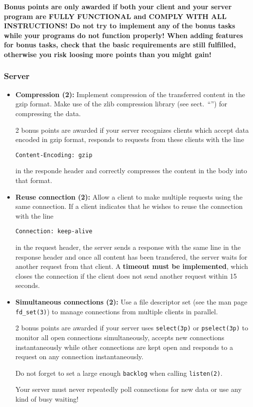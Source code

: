 \textbf{Bonus points are only awarded
if both your client and your server program are FULLY FUNCTIONAL
and COMPLY WITH ALL INSTRUCTIONS!
Do not try to implement any of the bonus tasks
while your programs do not function properly!
When adding features for bonus tasks,
check that the basic requirements are still fulfilled,
otherwise you risk loosing more points than you might gain!}

\subsubsection*{Server}

\begin{itemize}

\item \textbf{Compression (2):}
Implement compression of the transferred content in the gzip format.
Make use of the zlib compression library (see sect.~``'')
for compressing the data.

2 bonus points are awarded if your server recognizes clients
which accept data encoded in gzip format,
responds to requests from these clients with the line
\begin{verbatim}
Content-Encoding: gzip
\end{verbatim}
in the responde header
and correctly compresses the content in the body into that format.

\item \textbf{Reuse connection (2):}
Allow a client to make multiple requests using the same connection.
If a client indicates that he wishes to reuse the connection with the line
\begin{verbatim}
Connection: keep-alive
\end{verbatim}
in the request header,
the server sends a response with the same line in the response header
and once all content has been transfered,
the server waits for another request from that client.
A \textbf{timeout must be implemented},
which closes the connection
if the client does not send another request within 15 seconds.

\item \textbf{Simultaneous connections (2):}
Use a file descriptor set (see the man page \texttt{fd\_set(3)})
to manage connections from multiple clients in parallel.

2 bonus points are awarded if your server uses \texttt{select(3p)} or \texttt{pselect(3p)}
to monitor all open connections simultaneously,
accepts new connections instantaneously while other connections are kept open
and responds to a request on any connection instantaneously.

Do not forget to set a large enough \texttt{backlog} when calling \texttt{listen(2)}.

Your server must never repeatedly poll connections for new data
or use any kind of busy waiting!

\end{itemize}

